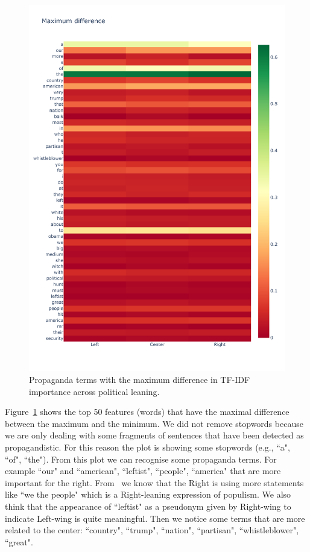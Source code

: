 \begin{figure}[!htbp]
    \centering
    \includegraphics[trim={0 0 0 2cm},clip,width=\linewidth]{figures/baly_prop_tech_words_all_across_leaning.pdf}
    \caption{Propaganda terms with the maximum difference in TF-IDF importance across political leaning.}
    \label{fig:baly_prop_tech_words_all_across_leaning}
\end{figure}

Figure~\ref{fig:baly_prop_tech_words_all_across_leaning} shows the top 50 features (words) that have the maximal difference between the maximum and the minimum.
We did not remove stopwords because we are only dealing with some fragments of sentences that have been detected as propagandistic. For this reason the plot is showing some stopwords (e.g., ``a", ``of", ``the").
From this plot we can recognise some propaganda terms.
For example ``our" and ``american", ``leftist", ``people", ``america" that are more important for the right. From~\citet{seargeant2020art} we know that the Right is using more statements like ``we the people" which is a Right-leaning expression of populism. We also think that the appearance of ``leftist" as a pseudonym given by Right-wing to indicate Left-wing is quite meaningful.
Then we notice some terms that are more related to the center: ``country", ``trump", ``nation", ``partisan", ``whistleblower", ``great".

